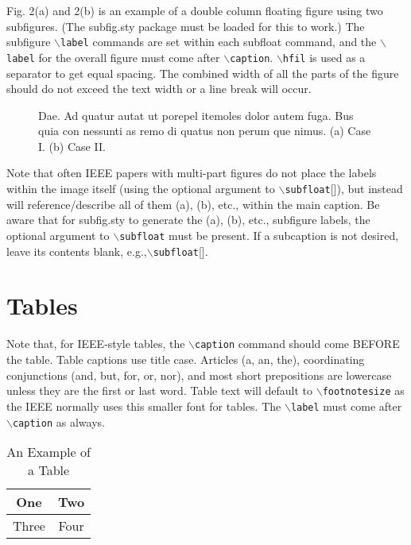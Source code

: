 \documentclass[lettersize,journal]{IEEEtran}
\begin{document}
    Fig. 2(a) and 2(b) is an example of a double column floating figure using two subfigures.
    (The subfig.sty package must be loaded for this to work.)
    The subfigure $\backslash${\tt{label}} commands are set within each subfloat command,
    and the $\backslash${\tt{label}} for the overall figure must come after $\backslash${\tt{caption}}.
    $\backslash${\tt{hfil}} is used as a separator to get equal spacing.
    The combined width of all the parts of the figure should do not exceed the text width or a line break will occur.
%
    \begin{figure*}[!t]
        \centering
        \hfil
        \caption{Dae. Ad quatur autat ut porepel itemoles dolor autem fuga. Bus quia con nessunti as remo di quatus non perum que nimus. (a) Case I. (b) Case II.}
        \label{fig_sim}
    \end{figure*}

    Note that often IEEE papers with multi-part figures do not place the labels within the image itself (using the optional argument to $\backslash${\tt{subfloat}}[]), but instead will
    reference/describe all of them (a), (b), etc., within the main caption.
    Be aware that for subfig.sty to generate the (a), (b), etc., subfigure
    labels, the optional argument to $\backslash${\tt{subfloat}} must be present. If a
    subcaption is not desired, leave its contents blank,
    e.g.,$\backslash${\tt{subfloat}}[].




    \section{Tables}
    Note that, for IEEE-style tables, the
    $\backslash${\tt{caption}} command should come BEFORE the table. Table captions use title case. Articles (a, an, the), coordinating conjunctions (and, but, for, or, nor), and most short prepositions are lowercase unless they are the first or last word. Table text will default to $\backslash${\tt{footnotesize}} as
    the IEEE normally uses this smaller font for tables.
    The $\backslash${\tt{label}} must come after $\backslash${\tt{caption}} as always.

    \begin{table}[!t]
        \caption{An Example of a Table\label{tab:table1}}
        \centering
        \begin{tabular}{|c||c|}
            \hline
            One & Two\\
            \hline
            Three & Four\\
            \hline
        \end{tabular}
    \end{table}
\end{document}
